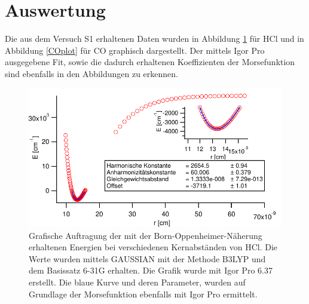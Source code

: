 \setlength\abovedisplayshortskip{20pt}
\setlength\belowdisplayshortskip{20pt}
\setlength\abovedisplayskip{20pt}
\setlength\belowdisplayskip{20pt}





\section{Auswertung}

Die aus dem Versuch S1 erhaltenen Daten wurden in Abbildung \ref{HCLplot} für HCl und in Abbildung \ref{COplot} für CO graphisch dargestellt. Der mittels Igor Pro ausgegebene Fit, sowie die dadurch erhaltenen Koeffizienten der Morsefunktion sind ebenfalls in den Abbildungen zu erkennen.
\begin{figure}[H]
	\centering	
	\begin{minipage}{1\textwidth}
	\includegraphics[width=\columnwidth]{Bilder/HCLGraph.pdf}
	\end{minipage}
	
	
	\caption{Grafische Auftragung der mit der Born-Oppenheimer-Näherung erhaltenen Energien bei verschiedenen Kernabständen von HCl. Die Werte wurden mittels GAUSSIAN mit der Methode B3LYP und dem Basissatz 6-31G erhalten. Die Grafik wurde mit Igor Pro 6.37 erstellt. Die blaue Kurve und deren Parameter, wurden auf Grundlage der Morsefunktion ebenfalls mit Igor Pro ermittelt.}
	

	\label{HCLplot}
\end{figure}
